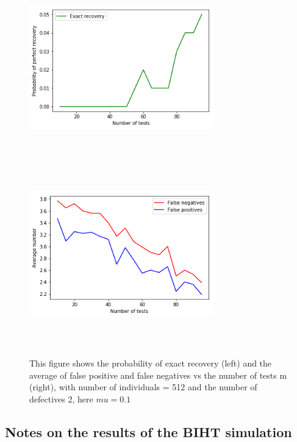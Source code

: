\begin{figure}[H]
	\includegraphics[height=8cm, width=8cm]{images/exa_mu}
	\includegraphics[height=8cm, width=8cm]{images/fal_mu}
	\caption{This figure shows the probability of exact recovery (left) and  the average of false positive and false negatives vs the number of tests m (right), with number of individuals  = 512 and the number of defectives 2, here $ mu = 0.1 $}
	\label{mu}
\end{figure}


\subsection{Notes on the results of the BIHT simulation} 



